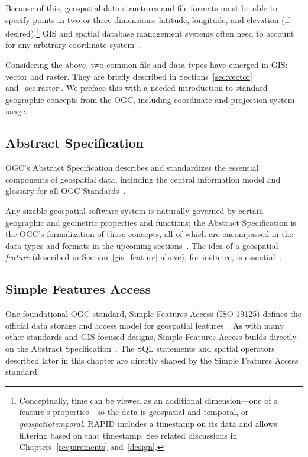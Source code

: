Because of this, geospatial data structures and file formats must be able to specify points in two or three dimensions: latitude, longitude, and elevation (if desired).\footnote{Conceptually, time can be viewed as an additional dimension---one of a feature's properties---so the data is geospatial and temporal, or \textit{geospatiotemporal}. RAPID includes a timestamp on its data and allows filtering based on that timestamp. See related discussions in Chapters~\ref{requirements} and~\ref{design}.} GIS and spatial database management systems often need to account for any arbitrary coordinate system~\cite{gentle_intro}.

Considering the above, two common file and data types have emerged in GIS: vector and raster. They are briefly described in Sections~\ref{sec:vector} and~\ref{sec:raster}. We preface this with a needed introduction to standard geographic concepts from the OGC, including coordinate and projection system usage.

\subsection{Abstract Specification}
OGC's Abstract Specification describes and standardizes the essential components of geospatial data, including the central information model and glossary for all OGC Standards~\cite{AbstractSpecFaq}.

Any sizable geospatial software system is naturally governed by certain geographic and geometric properties and functions; the Abstract Specification is the OGC's formalization of those concepts, all of which are encompassed in the data types and formats in the upcoming sections~\cite{AbstractSpecFaq}. The idea of a geospatial \textit{feature} (described in Section~\ref{gis_feature} above), for instance, is essential~\cite{Kottman2009,AbstractSpecFaq}.

\subsection{Simple Features Access}
One foundational OGC standard, Simple Features Access (ISO 19125) defines the official data storage and access model for geospatial features~\cite{SFA}. As with many other standards and GIS-focused designs, Simple Features Access builds directly on the Abstract Specification~\cite{SFA,AbstractSpecFaq}. The SQL statements and spatial operators described later in this chapter are directly shaped by the Simple Features Access standard.

